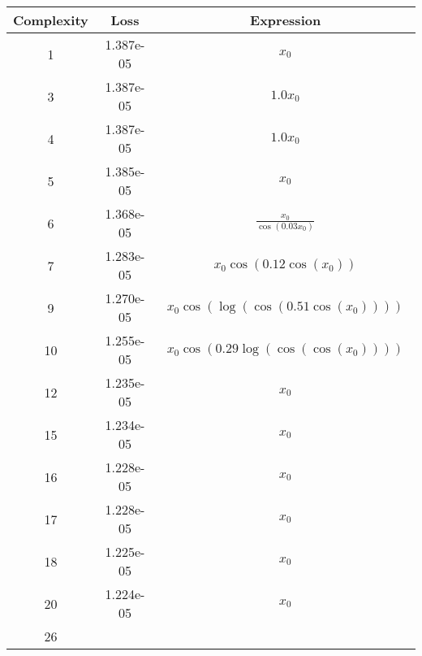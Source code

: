 \begin{center}
        \begin{tabular}{|c|c|c|}
        \hline
        Complexity & Loss & Expression \\
        \hline
        1 & 1.387e-05 & $\begin{aligned}x_{0}\end{aligned}$\\ \hline3 & 1.387e-05 & $\begin{aligned}1.0 x_{0}\end{aligned}$\\ \hline4 & 1.387e-05 & $\begin{aligned}1.0 x_{0}\end{aligned}$\\ \hline5 & 1.385e-05 & $\begin{aligned}x_{0}\end{aligned}$\\ \hline6 & 1.368e-05 & $\begin{aligned}\frac{x_{0}}{\cos{\left(0.03 x_{0} \right)}}\end{aligned}$\\ \hline7 & 1.283e-05 & $\begin{aligned}x_{0} \cos{\left(0.12 \cos{\left(x_{0} \right)} \right)}\end{aligned}$\\ \hline9 & 1.270e-05 & $\begin{aligned}x_{0} \cos{\left(\log{\left(\cos{\left(0.51 \cos{\left(x_{0} \right)} \right)} \right)} \right)}\end{aligned}$\\ \hline10 & 1.255e-05 & $\begin{aligned}x_{0} \cos{\left(0.29 \log{\left(\cos{\left(\cos{\left(x_{0} \right)} \right)} \right)} \right)}\end{aligned}$\\ \hline12 & 1.235e-05 & $\begin{aligned}x_{0}\end{aligned}$\\ \hline15 & 1.234e-05 & $\begin{aligned}x_{0}\end{aligned}$\\ \hline16 & 1.228e-05 & $\begin{aligned}x_{0}\end{aligned}$\\ \hline17 & 1.228e-05 & $\begin{aligned}x_{0}\end{aligned}$\\ \hline18 & 1.225e-05 & $\begin{aligned}x_{0}\end{aligned}$\\ \hline20 & 1.224e-05 & $\begin{aligned}x_{0}\end{aligned}$\\ \hline26 
\end{tabular}
\end{center}
